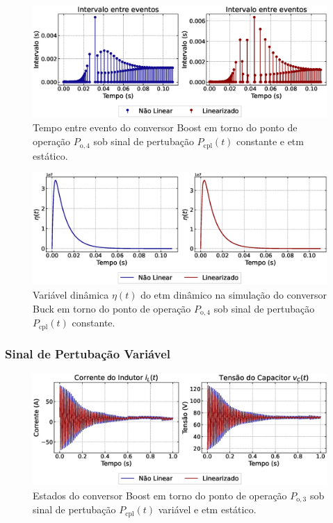 \begin{figure}[H]
  \centering
  \captionsetup{justification=centering}
  \includegraphics[width=1.\textwidth]{figuras/dynamic-etm/boost/sim1/op2/inter-event-times.eps}
  \caption{Tempo entre evento do conversor Boost em torno do ponto de operação $P_{\mathrm{o}, 4}$ sob sinal de pertubação $P_{\mathrm{cpl}}(t)$ constante e \acrshort{etm} estático.}
\end{figure}

\begin{figure}[H]
  \centering
  \captionsetup{justification=centering}
  \includegraphics[width=1.\textwidth]{figuras/dynamic-etm/boost/sim1/op2/eta.eps}
  \caption{Variável dinâmica $\eta(t)$ do \acrshort{etm} dinâmico na simulação do conversor Buck em torno do ponto de operação $P_{\mathrm{o}, 4}$ sob sinal de pertubação $P_{\mathrm{cpl}}(t)$ constante.}
\end{figure}

\subsubsection{Sinal de Pertubação Variável}

\begin{figure}[H]
  \centering
  \captionsetup{justification=centering}
  \includegraphics[width=1.\textwidth]{figuras/dynamic-etm/boost/sim2/op1/result.eps}
  \caption{Estados do conversor Boost em torno do ponto de operação $P_{\mathrm{o}, 3}$ sob sinal de pertubação $P_{\mathrm{cpl}}(t)$ variável e \acrshort{etm} estático.}
\end{figure}

